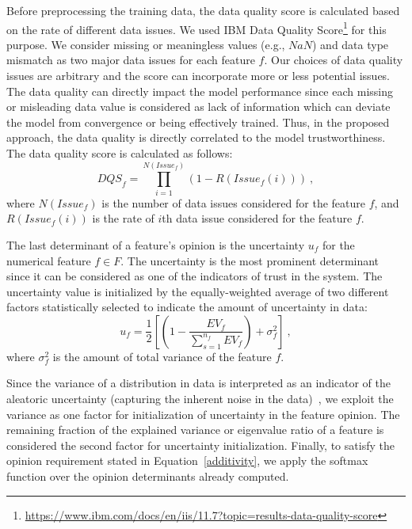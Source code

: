 Before preprocessing the training data, the data quality score is calculated based on the rate of different data issues. We used IBM Data Quality Score\footnote{\url{https://www.ibm.com/docs/en/iis/11.7?topic=results-data-quality-score}} for this purpose. We consider missing or meaningless values (e.g., $NaN$) and data type mismatch as two major data issues for each feature $f$. Our choices of data quality issues are arbitrary and the score can incorporate more or less potential issues. {\color{blue} The data quality can directly impact the model performance since each missing or misleading data value is considered as lack of information which can deviate the model from convergence or being effectively trained. Thus, in the proposed approach, the data quality is directly correlated to the model trustworthiness.}%
The data quality score is calculated as follows:
\begin{equation}
{DQS}_{f} = \prod_{i=1}^{N({Issue}_{f})} (1 - R({Issue}_{f}(i)))\ ,
\label{dqs}
\end{equation}
where $N({Issue}_{f})$ is the number of data issues considered for the feature $f$, and $R({Issue}_{f}(i))$ is the rate of $i$th data issue considered for the feature $f$.

The last determinant of a feature's opinion is the uncertainty $u_{f}$ for the numerical feature $f \in F$. The uncertainty is the most prominent determinant since it can be considered as one of the indicators of trust in the system. The uncertainty value is initialized by the equally-weighted average of two different factors statistically selected to indicate the amount of uncertainty in data:
\begin{equation}
u_{f} = \frac{1}{2}[(1 - \frac{{EV}_{f}}{\sum_{s=1}^{n_f} {EV}_{f}}) + {\sigma}_{f}^2]\ ,
\label{num_u}    
\end{equation}
where ${\sigma}_{f}^2$ is the amount of total variance of the feature $f$. 

Since the variance of a distribution in data is interpreted as an indicator of the aleatoric uncertainty (capturing the inherent noise in the data)~\cite{uncer-var}, we exploit the variance as one factor for initialization of uncertainty in the feature opinion. The remaining fraction of the explained variance or eigenvalue ratio of a feature is considered the second factor for uncertainty initialization. Finally, to satisfy the opinion requirement stated in Equation~\ref{additivity}, we apply the softmax function over the opinion determinants already computed.
\vspace{2mm}

